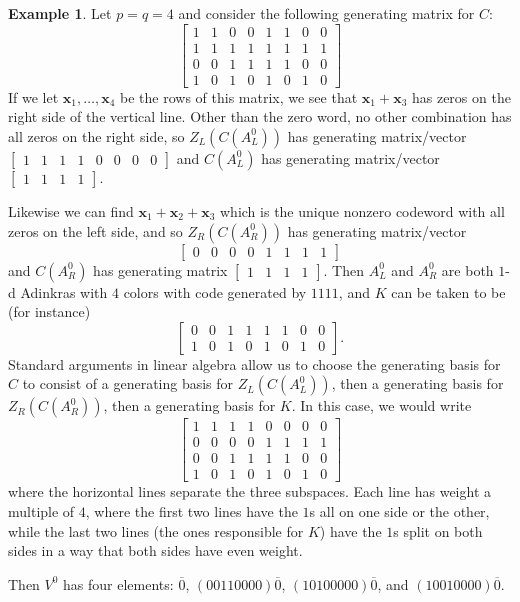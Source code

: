 \documentclass[12pt,twoside,singlespace]{article}
\numberwithin{equation}{section}
\theoremstyle{definition}
\newtheorem{ex}[equation]{Example}
\renewcommand{\vec}[1]{\mathbf{#1}}
\begin{document}
\begin{ex}
Let $p=q=4$ and consider the following generating matrix for $C$:
\[\left[\begin{array}{cccc|cccc}
1&1&0&0&1&1&0&0\\
1&1&1&1&1&1&1&1\\
0&0&1&1&1&1&0&0\\
1&0&1&0&1&0&1&0
\end{array}\right]\]
If we let $\vec{x}_1, \ldots, \vec{x}_4$ be the rows of this matrix, we see that $\vec{x}_1+\vec{x}_3$ has zeros on the right side of the vertical line.  Other than the zero word, no other combination has all zeros on the right side, so $Z_L(C(A_L^0))$ has generating matrix/vector $\left[\begin{array}{cccc|cccc}
1&1&1&1&0&0&0&0
\end{array}\right]$ and $C(A_L^0)$ has generating matrix/vector $\left[\begin{array}{cccc}
1&1&1&1
\end{array}\right].$

Likewise we can find $\vec{x}_1+\vec{x}_2+\vec{x}_3$ which is the unique nonzero codeword with all zeros on the left side, and so $Z_R(C(A_R^0))$ has generating matrix/vector
\[\left[\begin{array}{cccc|cccc}
0&0&0&0&1&1&1&1
\end{array}\right]\]
and $C(A_R^0)$ has generating matrix $\left[\begin{array}{cccc}
1&1&1&1
\end{array}\right].$ Then $A_L^0$ and $A_R^0$ are both $1$-d Adinkras with $4$ colors with code generated by $1111$, and $K$ can be taken to be (for instance)
\[\left[\begin{array}{cccc|cccc}
0&0&1&1&1&1&0&0\\
1&0&1&0&1&0&1&0
\end{array}\right].\]
Standard arguments in linear algebra allow us to choose the generating basis for $C$ to consist of a generating basis for $Z_L(C(A_L^0))$, then a generating basis for $Z_R(C(A_R^0))$, then a generating basis for $K$.  In this case, we would write
\[\left[\begin{array}{cccc|cccc}
1&1&1&1&0&0&0&0\\\hline
0&0&0&0&1&1&1&1\\\hline
0&0&1&1&1&1&0&0\\
1&0&1&0&1&0&1&0
\end{array}\right]\]
where the horizontal lines separate the three subspaces.  Each line has weight a multiple of $4$, where the first two lines have the $1$s all on one side or the other, while the last two lines (the ones responsible for $K$) have the $1$s split on both sides in a way that both sides have even weight.

Then $V^0$ has four elements: $\overline{0}$, $(00110000)\overline{0}$, $(10100000)\overline{0}$, and $(10010000)\overline{0}$.
\end{ex}
\end{document}
